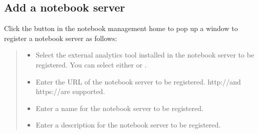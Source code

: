 \documentclass[letterpaper,10pt,english]{sphinxmanual}
\begin{document}
\subsection{Add a notebook server}
\label{\detokenize{discovery/part05/notebook_management:id3}}
Click the  button in the notebook management home to pop up a window to register a notebook server as follows:
\begin{quote}

\begin{figure}[H]
\centering

\noindent{}
\end{figure}
\begin{itemize}
\item {} 
 Select the external analytics tool installed in the notebook server to be registered. You can select either  or .

\item {} 
 Enter the URL of the notebook server to be registered. http://and https://are supported.

\item {} 
 Enter a name for the notebook server to be registered.

\item {} 
 Enter a description for the notebook server to be registered.

\end{itemize}
\end{quote}
\end{document}
